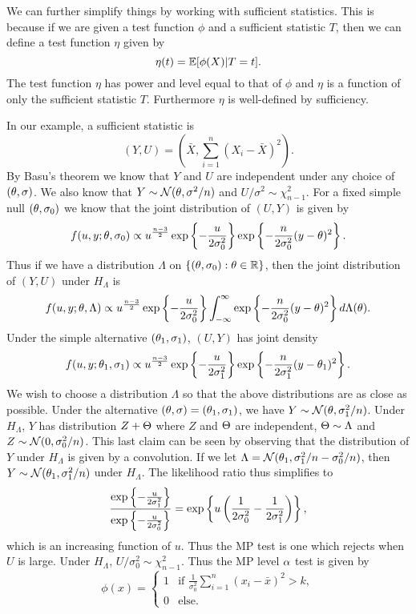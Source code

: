 We can further simplify things by working with sufficient statistics. This is because if we are given a test function $\phi$ and a sufficient statistic $T$, then we can define a test function $\eta$ given by 
\[\eta(t) = {\mathbb{E}}[\phi(X)|T=t]. \]
The test function $\eta$ has power and level equal to that of $\phi$ and $\eta$ is a function of only the sufficient statistic $T$. Furthermore $\eta$ is well-defined by sufficiency. 

In our example, a sufficient statistic is
\[(Y,U) = \left(\bar{X}, \sum_{i=1}^n (X_i-\bar{X})^2\right). \]
By Basu's theorem we know that $Y$ and $U$ are independent under any choice of $({\theta},\sigma)$. We also know that $Y \sim {{\mathcal{N}}}({\theta}, \sigma^2/n)$ and $U/\sigma^2 \sim \chi^2_{n-1}$. For a fixed simple null $({\theta},\sigma_0)$ we know that the joint distribution of $(U,Y)$ is given by 
\[f(u,y;{\theta},\sigma_0)\propto u^\frac{{n-3}}{2} \exp\left\{-\frac{u}{2\sigma_0^2}\right\}\exp\left\{-\frac{n}{2\sigma_0^2}(y-{\theta})^2\right\}. \]
Thus if we have a distribution $\Lambda$ on $\{({\theta},\sigma_0): {\theta} \in {\mathbb R}\}$, then the joint distribution of $(Y,U)$ under $H_\Lambda$ is
\[f(u,y;{\theta},\Lambda) \propto u^\frac{n-3}{2}\exp\left\{-\frac{u}{2\sigma_0^2}\right\}\int_{-\infty}^\infty \exp\left\{-\frac{n}{2\sigma_0^2}(y-{\theta})^2\right\}d\Lambda({\theta}).\]
Under the simple alternative $({\theta}_1,\sigma_1)$, $(U,Y)$ has joint density
\[f(u,y; {\theta}_1,\sigma_1) \propto u^\frac{{n-3}}{2} \exp\left\{-\frac{u}{2\sigma_1^2}\right\}\exp\left\{-\frac{n}{2\sigma_1^2}(y-{\theta}_1)^2\right\}. \]
We wish to choose a distribution $\Lambda$ so that the above distributions are as close as possible. Under the alternative $({\theta},\sigma)=({\theta}_1,\sigma_1)$, we have $Y \sim {{\mathcal{N}}}({\theta},\sigma_1^2/n)$. Under $H_\Lambda$, $Y$ has distribution $Z+{\Theta}$ where $Z$ and ${\Theta}$ are independent, ${\Theta} \sim\Lambda$ and $Z \sim {{\mathcal{N}}}(0,\sigma^2_0/n)$. This last claim can be seen by observing that the distribution of $Y$ under $H_\Lambda$ is given by a convolution. If we let $\Lambda = {{\mathcal{N}}}({\theta}_1, \sigma_1^2/n - \sigma_0^2/n)$, then $Y \sim {{\mathcal{N}}}({\theta}_1, \sigma_1^2/n)$ under $H_\Lambda$. The likelihood ratio thus simplifies to 
\[\frac{\exp\left\{-\frac{u}{2\sigma_1^2}\right\}}{\exp\left\{-\frac{u}{2\sigma_0^2}\right\}} = \exp\left\{u\left(\frac{1}{2\sigma_0^2}-\frac{1}{2\sigma_1^2}\right)\right\}, \]
which is an increasing function of $u$. Thus the MP test is one which rejects when $U$ is large. Under $H_\Lambda$, $U/\sigma_0^2 \sim \chi^2_{n-1}$. Thus the MP level ${\alpha}$ test is given by 
\[\phi(x) = \begin{cases}
    1 & \text{if } \frac{1}{\sigma_0^2}\sum_{i=1}^n (x_i-\bar{x})^2 > k,\\
    0 & \text{else}.
\end{cases} \] 
